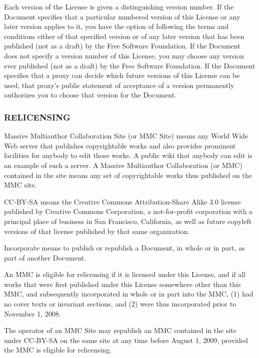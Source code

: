 \documentclass[10pt,english]{article}
\begin{document}
Each version of the License is given a distinguishing version number.
If the Document specifies that a particular numbered version of this
License \textquotedbl{}or any later version\textquotedbl{} applies
to it, you have the option of following the terms and conditions either
of that specified version or of any later version that has been published
(not as a draft) by the Free Software Foundation. If the Document
does not specify a version number of this License, you may choose
any version ever published (not as a draft) by the Free Software Foundation.
If the Document specifies that a proxy can decide which future versions
of this License can be used, that proxy's public statement of acceptance
of a version permanently authorizes you to choose that version for
the Document.


\subsubsection{RELICENSING}

\textquotedbl{}Massive Multiauthor Collaboration Site\textquotedbl{}
(or \textquotedbl{}MMC Site\textquotedbl{}) means any World Wide Web
server that publishes copyrightable works and also provides prominent
facilities for anybody to edit those works. A public wiki that anybody
can edit is an example of such a server. A \textquotedbl{}Massive
Multiauthor Collaboration\textquotedbl{} (or \textquotedbl{}MMC\textquotedbl{})
contained in the site means any set of copyrightable works thus published
on the MMC site.

\textquotedbl{}CC-BY-SA\textquotedbl{} means the Creative Commons
Attribution-Share Alike 3.0 license published by Creative Commons
Corporation, a not-for-profit corporation with a principal place of
business in San Francisco, California, as well as future copyleft
versions of that license published by that same organization.

\textquotedbl{}Incorporate\textquotedbl{} means to publish or republish
a Document, in whole or in part, as part of another Document.

An MMC is \textquotedbl{}eligible for relicensing\textquotedbl{} if
it is licensed under this License, and if all works that were first
published under this License somewhere other than this MMC, and subsequently
incorporated in whole or in part into the MMC, (1) had no cover texts
or invariant sections, and (2) were thus incorporated prior to November
1, 2008.

The operator of an MMC Site may republish an MMC contained in the
site under CC-BY-SA on the same site at any time before August 1,
2009, provided the MMC is eligible for relicensing.
\end{document}
